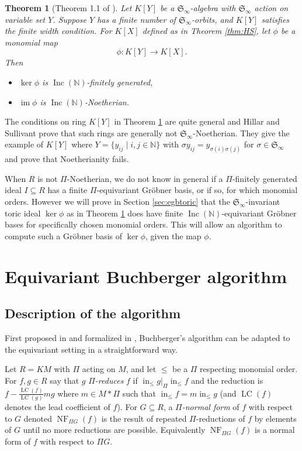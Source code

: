 \documentclass{amsart}
\newtheorem{theorem}{Theorem}[section]
\theoremstyle{definition}
\theoremstyle{remark}
\numberwithin{equation}{section}
\newcommand{\B}[1]{\mathbb #1}
\newcommand{\F}[1]{\mathfrak #1}
\DeclareMathOperator{\initial}{in}
\DeclareMathOperator{\NF}{NF}
\DeclareMathOperator{\im}{im}
\newcommand{\Inc}{\operatorname{Inc}(\B N)}
\newcommand{\mon}{M}
\newcommand{\Sym}{\F S_\infty}
\newcommand{\LT}{\initial_{\leq}}
\newcommand{\LC}{\operatorname{LC}}
\begin{document}
\begin{theorem}[Theorem 1.1 of \cite{draisma2013noetherianity}]\label{thm:DEKL}
 Let $K[Y]$ be a $\Sym$-algebra with $\Sym$ action on variable set $Y$.  Suppose $Y$ has a finite number of $\Sym$-orbits, and $K[Y]$ satisfies the finite width condition.  For $K[X]$ defined as in Theorem \ref{thm:HS}, let $\phi$ be a monomial map
  \[ \phi: K[Y] \to K[X]. \]
 Then
 \begin{itemize}
  \item $\ker \phi$ is $\Inc$-finitely generated,
  \item $\im \phi$ is $\Inc$-Noetherian.
 \end{itemize}
\end{theorem}

The conditions on ring $K[Y]$ in Theorem \ref{thm:DEKL} are quite general and Hillar and Sullivant \cite{hillar2012finite} prove that such rings are generally not $\Sym$-Noetherian.  They give the example of $K[Y]$ where $Y = \{y_{ij} \mid i, j \in \B N\}$ with $\sigma y_{ij} = y_{\sigma(i)\sigma(j)}$ for $\sigma \in \Sym$ and prove that Noetherianity fails.

When $R$ is not $\Pi$-Noetherian, we do not know in general if a $\Pi$-finitely generated ideal $I\subseteq R$ has a finite $\Pi$-equivariant Gr\"obner basis, or if so, for which monomial orders.  However we will prove in Section \ref{sec:egbtoric} that the $\Sym$-invariant toric ideal $\ker \phi$ as in Theorem \ref{thm:DEKL} does have finite $\Inc$-equivariant Gr\"obner bases for specifically chosen monomial orders.  This will allow an algorithm to compute such a Gr\"obner basis of $\ker \phi$, given the map $\phi$.

\section{Equivariant Buchberger algorithm}
\subsection{Description of the algorithm}
First proposed in \cite{aschenbrenner2007finite} and formalized in \cite{Brouwer09e}, Buchberger's algorithm can be adapted to the equivariant setting in a straightforward way.

Let $R = K\mon$ with $\Pi$ acting on $\mon$, and let $\leq$ be a $\Pi$ respecting monomial order.  For $f,g \in R$ say that $g$ {\em $\Pi$-reduces} $f$ if $\LT g |_{\Pi} \LT f$ and the reduction is $f - \frac{\LC(f)}{\LC(g)}mg$ where $m \in \mon *\Pi$ such that $\LT f = m\LT g$ (and $\LC(f)$ denotes the lead coefficient of $f$).  For $G \subseteq R$, a {\em $\Pi$-normal form} of $f$ with respect to $G$ denoted $\NF_{\Pi G}(f)$ is the result of repeated $\Pi$-reductions of $f$ by elements of $G$ until no more reductions are possible.  Equivalently $\NF_{\Pi G}(f)$ is a normal form of $f$ with respect to $\Pi G$.
\end{document}
